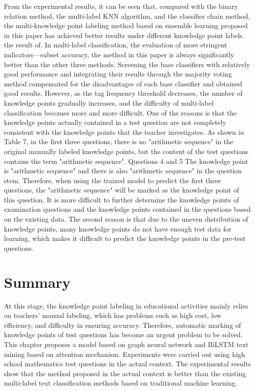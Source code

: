 From the experimental results, it can be seen that, compared with the binary relation method, the multi-label KNN algorithm, and the classifier chain method, the multi-knowledge point labeling method based on ensemble learning proposed in this paper has achieved better results under different knowledge point labels. the result of. In multi-label classification, the evaluation of more stringent indicators—subset accuracy, the method in this paper is always significantly better than the other three methods. Screening the base classifiers with relatively good performance and integrating their results through the majority voting method compensated for the disadvantages of each base classifier and obtained good results. However, as the tag frequency threshold decreases, the number of knowledge points gradually increases, and the difficulty of multi-label classification becomes more and more difficult. One of the reasons is that the knowledge points actually contained in a test question are not completely consistent with the knowledge points that the teacher investigates. As shown in Table 7, in the first three questions, there is no "arithmetic sequence" in the original manually labeled knowledge points, but the content of the test questions contains the term "arithmetic sequence". Questions 4 and 5 The knowledge point is "arithmetic sequence" and there is also "arithmetic sequence" in the question stem. Therefore, when using the trained model to predict the first three questions, the "arithmetic sequence" will be marked as the knowledge point of this question. It is more difficult to further determine the knowledge points of examination questions and the knowledge points contained in the questions based on the existing data. The second reason is that due to the uneven distribution of knowledge points, many knowledge points do not have enough test data for learning, which makes it difficult to predict the knowledge points in the pre-test questions.
\section{Summary}
At this stage, the knowledge point labeling in educational activities mainly relies on teachers' manual labeling, which has problems such as high cost, low efficiency, and difficulty in ensuring accuracy. Therefore, automatic marking of knowledge points of test questions has become an urgent problem to be solved. This chapter proposes a model based on graph neural network and BiLSTM text mining based on attention mechanism. Experiments were carried out using high school mathematics test questions in the actual context. The experimental results show that the method proposed in the actual context is better than the existing multi-label text classification methods based on traditional machine learning.

